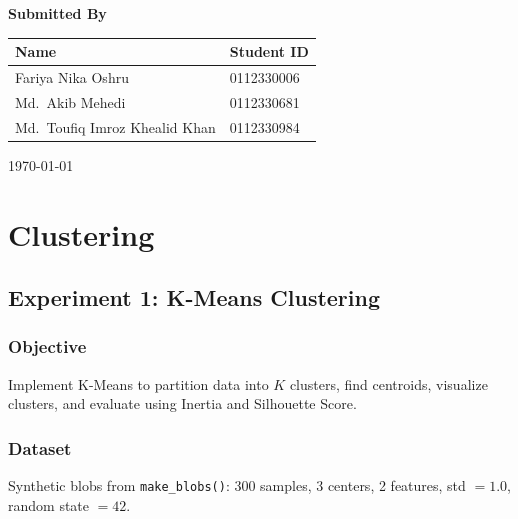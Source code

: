 \documentclass[a4paper,10pt]{article}
\begin{document}
\begin{titlepage}
\vspace{1.8cm}

{\large\bfseries Submitted By}\\[0.4cm]
\begin{tabular}{@{}ll@{}}
\toprule
\textbf{Name} & \textbf{Student ID} \\
\midrule
Fariya Nika Oshru              & 0112330006 \\
Md.\ Akib Mehedi               & 0112330681 \\
Md.\ Toufiq Imroz Khealid Khan & 0112330984 \\
\bottomrule
\end{tabular}

\vfill

{\small \today}\\[0.4cm]

\end{titlepage}

\tableofcontents
\newpage

\section{Clustering}

\subsection{Experiment 1: K-Means Clustering}

\subsubsection{Objective}
Implement K-Means to partition data into \(K\) clusters, find centroids, visualize clusters, and evaluate using Inertia and Silhouette Score.

\subsubsection{Dataset}
Synthetic blobs from \texttt{make\_blobs()}: 300 samples, 3 centers, 2 features, std \(=1.0\), random state \(=42\).
\end{document}
